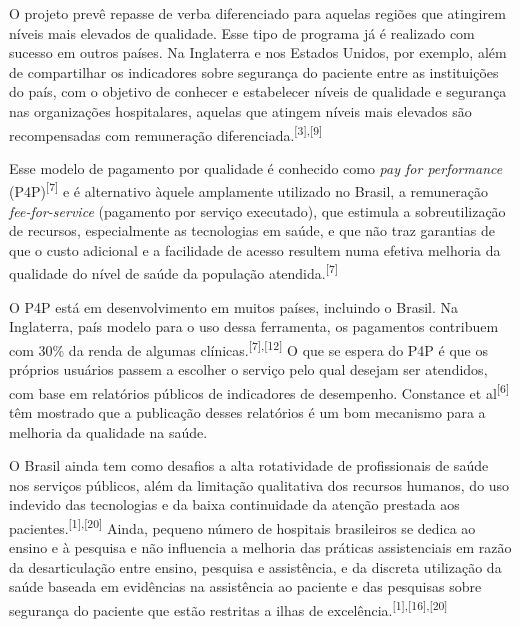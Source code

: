\documentclass{article}
\begin{document}
O projeto prevê repasse de verba diferenciado para aquelas regiões que atingirem
níveis
mais elevados de qualidade. Esse tipo de programa já é realizado com sucesso em
outros
países. Na Inglaterra e nos Estados Unidos, por exemplo, além de compartilhar os
indicadores
sobre segurança do paciente entre as instituições do país, com o objetivo de
conhecer e
estabelecer níveis de qualidade e segurança nas organizações hospitalares,
aquelas que
atingem níveis mais elevados são recompensadas com remuneração diferenciada.\textsuperscript{[}\textsuperscript{3}\textsuperscript{]}\textsuperscript{,}\textsuperscript{[}\textsuperscript{9}\textsuperscript{]}

Esse modelo de pagamento por qualidade é conhecido como \textit{pay for
performance}
(P4P)\textsuperscript{[}\textsuperscript{7}\textsuperscript{]}
e é alternativo àquele amplamente utilizado no Brasil, a remuneração
\textit{fee-for-service}
(pagamento por serviço executado), que estimula a
sobreutilização de recursos, especialmente as tecnologias em saúde, e que não
traz garantias
de que o custo adicional e a facilidade de acesso resultem numa efetiva melhoria
da
qualidade do nível de saúde da população atendida.\textsuperscript{[}\textsuperscript{7}\textsuperscript{]}

O P4P está em desenvolvimento em muitos países, incluindo o Brasil. Na
Inglaterra, país
modelo para o uso dessa ferramenta, os pagamentos contribuem com 30\% da renda
de algumas
clínicas.\textsuperscript{[}\textsuperscript{7}\textsuperscript{]}\textsuperscript{,}\textsuperscript{[}\textsuperscript{12}\textsuperscript{]}
O que se espera do P4P é que os próprios usuários passem a escolher o serviço
pelo
qual desejam ser atendidos, com base em relatórios públicos de indicadores de
desempenho.
Constance et al\textsuperscript{[}\textsuperscript{6}\textsuperscript{]}
têm mostrado que a publicação desses relatórios é um bom mecanismo para a
melhoria
da qualidade na saúde.

O Brasil ainda tem como desafios a alta rotatividade de profissionais de saúde
nos serviços
públicos, além da limitação qualitativa dos recursos humanos, do uso indevido
das
tecnologias e da baixa continuidade da atenção prestada aos pacientes.\textsuperscript{[}\textsuperscript{1}\textsuperscript{]}\textsuperscript{,}\textsuperscript{[}\textsuperscript{20}\textsuperscript{]}
Ainda, pequeno número de hospitais brasileiros se dedica ao ensino e à pesquisa
e
não influencia a melhoria das práticas assistenciais em razão da desarticulação
entre
ensino, pesquisa e assistência, e da discreta utilização da saúde baseada em
evidências na
assistência ao paciente e das pesquisas sobre segurança do paciente que estão
restritas a
ilhas de excelência.\textsuperscript{[}\textsuperscript{1}\textsuperscript{]}\textsuperscript{,}\textsuperscript{[}\textsuperscript{16}\textsuperscript{]}\textsuperscript{,}\textsuperscript{[}\textsuperscript{20}\textsuperscript{]}
\end{document}
